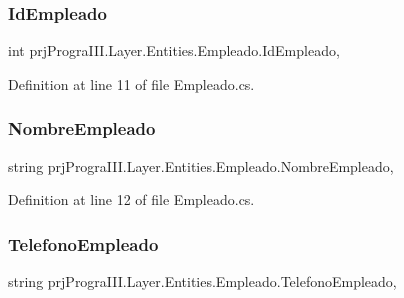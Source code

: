\subsubsection{\texorpdfstring{Id\+Empleado}{IdEmpleado}}
{\footnotesize\ttfamily int prj\+Progra\+I\+I\+I.\+Layer.\+Entities.\+Empleado.\+Id\+Empleado\hspace{0.3cm}{\ttfamily [get]}, {\ttfamily [set]}}



Definition at line 11 of file Empleado.\+cs.

\hypertarget{classprj_progra_i_i_i_1_1_layer_1_1_entities_1_1_empleado_a1e1785328a4e1f2d63d61c44e9fc0866}{}\label{classprj_progra_i_i_i_1_1_layer_1_1_entities_1_1_empleado_a1e1785328a4e1f2d63d61c44e9fc0866} 
\subsubsection{\texorpdfstring{Nombre\+Empleado}{NombreEmpleado}}
{\footnotesize\ttfamily string prj\+Progra\+I\+I\+I.\+Layer.\+Entities.\+Empleado.\+Nombre\+Empleado\hspace{0.3cm}{\ttfamily [get]}, {\ttfamily [set]}}



Definition at line 12 of file Empleado.\+cs.

\hypertarget{classprj_progra_i_i_i_1_1_layer_1_1_entities_1_1_empleado_a50c4e6598f83c7695206c753bbc761b4}{}\label{classprj_progra_i_i_i_1_1_layer_1_1_entities_1_1_empleado_a50c4e6598f83c7695206c753bbc761b4} 
\subsubsection{\texorpdfstring{Telefono\+Empleado}{TelefonoEmpleado}}
{\footnotesize\ttfamily string prj\+Progra\+I\+I\+I.\+Layer.\+Entities.\+Empleado.\+Telefono\+Empleado\hspace{0.3cm}{\ttfamily [get]}, {\ttfamily [set]}}




